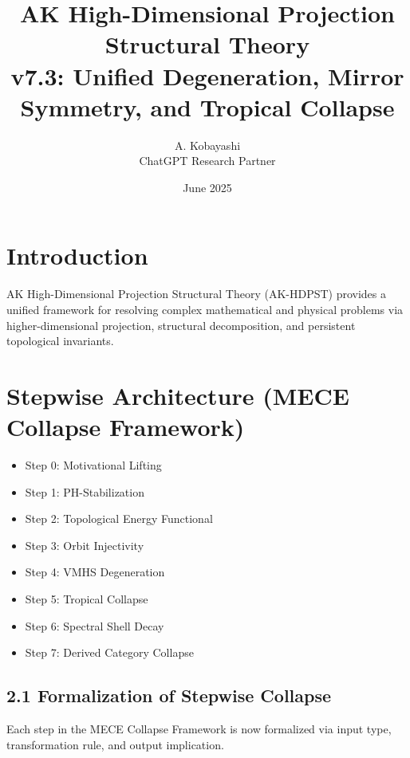 \documentclass[11pt]{article}
\title{AK High-Dimensional Projection Structural Theory\\
\large v7.3: Unified Degeneration, Mirror Symmetry, and Tropical Collapse}
\author{A. Kobayashi \\ ChatGPT Research Partner}
\date{June 2025}
\begin{document}
\maketitle

\tableofcontents
\newpage


\section{Introduction}
AK High-Dimensional Projection Structural Theory (AK-HDPST) provides a unified framework for resolving complex mathematical and physical problems via higher-dimensional projection, structural decomposition, and persistent topological invariants.


\section{Stepwise Architecture (MECE Collapse Framework)}
\begin{itemize}
    \item Step 0: Motivational Lifting
    \item Step 1: PH-Stabilization
    \item Step 2: Topological Energy Functional
    \item Step 3: Orbit Injectivity
    \item Step 4: VMHS Degeneration
    \item Step 5: Tropical Collapse
    \item Step 6: Spectral Shell Decay
    \item Step 7: Derived Category Collapse
\end{itemize}

\subsection*{2.1 Formalization of Stepwise Collapse}

Each step in the MECE Collapse Framework is now formalized via input type, transformation rule, and output implication.
\end{document}
